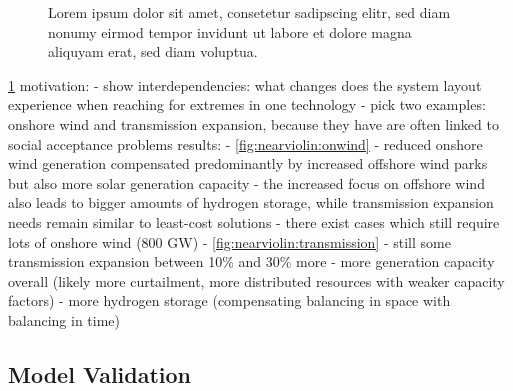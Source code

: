 \begin{figure}
    \noindent{}
    \caption{Lorem ipsum dolor sit amet, consetetur sadipscing elitr, sed diam nonumy eirmod tempor invidunt ut labore et dolore magna aliquyam erat, sed diam voluptua.}
    \label{fig:nearviolin}
\end{figure}

\cref{fig:nearviolin}
motivation:
- show interdependencies: what changes does the system layout experience when reaching for extremes in one technology
- pick two examples: onshore wind and transmission expansion, because they have are often linked to social acceptance problems
results:
- \cref{fig:nearviolin:onwind}
  - reduced onshore wind generation compensated predominantly by increased offshore wind parks but also more solar generation capacity
  - the increased focus on offshore wind also leads to bigger amounts of hydrogen storage, while transmission expansion needs remain similar to least-cost solutions
  - there exist cases which still require lots of onshore wind (800 GW)
- \cref{fig:nearviolin:transmission}
  - still some transmission expansion between 10\% and 30\% more
  - more generation capacity overall (likely more curtailment, more distributed resources with weaker capacity factors)
  - more hydrogen storage (compensating balancing in space with balancing in time)

\subsection{Model Validation}


